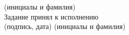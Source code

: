 \begin{titlepage}
        \hspace{3cm}(инициалы и фамилия)\normalsize\\
    Задание принял к исполнению \hspace{0.2cm}\underline{\hspace{5cm}}
        \hspace{0.5cm} \underline{\hspace{4.2cm}}\\
        \vspace{-0.2cm}\hspace{8cm}\footnotesize(подпись, дата)
        \hspace{3cm}(инициалы и фамилия)\normalsize\\
\end{titlepage}
\setcounter{page}{3}